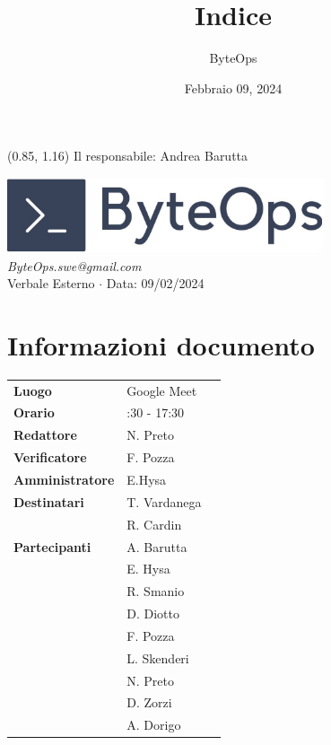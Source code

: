 \documentclass{article}
\title{\textbf{\fontsize{28}{6}\selectfont Indice}}
\author{\fontsize{14}{6}\selectfont ByteOps}
\date{Febbraio 09, 2024}
\begin{document}
\begin{textblock*}{\textwidth}(0.85\textwidth, 1.16\textheight)
    Il responsabile: Andrea Barutta
\end{textblock*}

\pagestyle{fancy}
\begin{center}
\includegraphics[width = 0.7\textwidth]{../../../Images/logo.png} \\
\vspace{0.2cm}
\textcolor[RGB]{60, 60, 60}{\textit{ByteOps.swe@gmail.com}} \\
\vspace{1cm}
\fontsize{16}{6}\selectfont Verbale Esterno $\cdot$ Data: 09/02/2024 \\
\vspace{0.5cm}
\end{center}

\section*{Informazioni documento}
\def\arraystretch{1.2}
\begin{tabular}{>{\raggedleft\arraybackslash}p{}|>{\raggedright\arraybackslash}p{}c}
\hline
\addlinespace
\textbf{Luogo} & Google Meet \vspace{10pt} \\
\textbf{Orario} & 16:30 - 17:30 \vspace{10pt} \\
\textbf{Redattore} & N. Preto \vspace{10pt} \\
\textbf{Verificatore} & F. Pozza \vspace{10pt} \\
\textbf{Amministratore} & E.Hysa \vspace{10pt} \\
\textbf{Destinatari} & T. Vardanega \\ & R. Cardin \vspace{10pt} \\
\textbf{Partecipanti} & A. Barutta \\ & E. Hysa \\ & R. Smanio \\ & D. Diotto \\ & F. Pozza \\ & L. Skenderi \\ & N. Preto \\ & D. Zorzi \\ & A. Dorigo \vspace{10pt}
\end{tabular}
\pagebreak 
\end{document}
